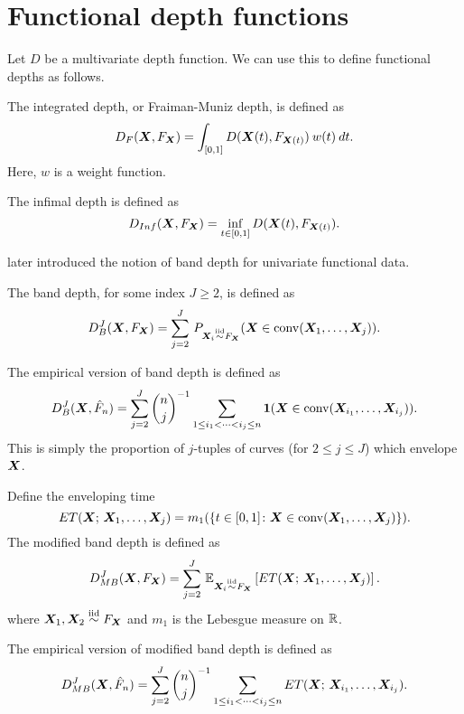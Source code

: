 \section{Functional depth functions}

Let $D$ be a multivariate depth function.
We can use this to define functional depths as follows.

\begin{definition}
    The integrated depth, or Fraiman-Muniz depth, is defined as
    \begin{equation}
        D_F(\bm{X}, F_{\bm{X}}) = \int_{[0, 1]} D(\bm{X}(t), F_{\bm{X}(t)})\:w(t)\:dt.
    \end{equation}
    Here, $w$ is a weight function.
\end{definition}

\begin{definition}
    The infimal depth is defined as
    \begin{equation}
        D_{Inf}(\bm{X}, F_{\bm{X}}) = \inf_{t \in [0, 1]} D(\bm{X}(t), F_{\bm{X}(t)}).
    \end{equation}
\end{definition}


\textcite{pintado-romo-2009} later introduced the notion of band depth for
univariate functional data.

\begin{definition}
    The band depth, for some index $J \geq 2$, is defined as
    \begin{equation}
        D_B^J(\bm{X}, F_{\bm{X}}) = \sum_{j = 2}^J\, P_{\bm{X}_i \overset{\text{iid}}{\sim} F_{\bm{X}}}(\bm{X} \in \operatorname{conv}(\bm{X}_1, \dots, \bm{X}_j)).
    \end{equation}
\end{definition}
The empirical version of band depth is defined as
\begin{equation}
    D_B^J(\bm{X}, \hat{F}_n) = \sum_{j = 2}^J\binom{n}{j}^{-1} \sum_{\substack{1 \leq i_1 < \dots < i_j \leq n}} \bm{1}(\bm{X} \in \operatorname{conv}(\bm{X}_{i_1}, \dots, \bm{X}_{i_j})).
\end{equation}
This is simply the proportion of $j$-tuples of curves (for $2 \leq j \leq J$)
which envelope $\bm{X}$.

\begin{definition}
    Define the enveloping time
    \begin{equation}
        ET(\bm{X};\, \bm{X}_1, \dots, \bm{X}_j) = m_1(\{t \in [0, 1]\colon \bm{X} \in \operatorname{conv}(\bm{X}_1, \dots, \bm{X}_j)\}).
    \end{equation}
    The modified band depth is defined as
    \begin{equation}
        D_{MB}^J(\bm{X}, F_{\bm{X}}) = \sum_{j = 2}^J\, \operatorname{\mathbb{E}}_{\bm{X}_i \overset{\text{iid}}{\sim} F_{\bm{X}}}\left[ ET(\bm{X};\, \bm{X}_1, \dots, \bm{X}_j)\right].
    \end{equation}
    where $\bm{X}_1, \bm{X}_2 \overset{\text{iid}}{\sim} F_{\bm{X}}$ and $m_1$ is the Lebesgue measure on
    $\mathbb{R}$.
\end{definition}
The empirical version of modified band depth is defined as
\begin{equation}
    D_{MB}^J(\bm{X}, \hat{F}_n) = \sum_{j = 2}^J\binom{n}{j}^{-1} \sum_{\substack{1 \leq i_1 < \dots < i_j \leq n}} ET(\bm{X};\, \bm{X}_{i_1}, \dots, \bm{X}_{i_j}).
\end{equation}


